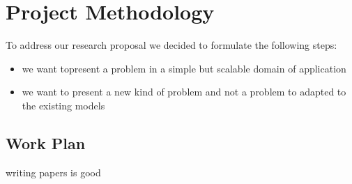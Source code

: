 \chapter{Project Methodology}
\label{ch04:methodology}

To address our research proposal we decided to formulate the following steps:

\begin{itemize}
\item we want topresent a problem in a simple but scalable domain of application
\item we want to present a new kind of problem and not a problem to adapted to the existing models
\end{itemize}


\section{Work Plan}
\label{sec:work-plan}

writing papers is good 


